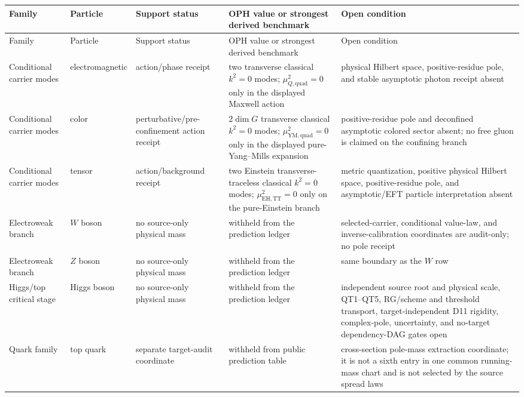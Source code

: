 \documentclass[11pt]{article}
\begin{document}
\tiny
\setlength{\tabcolsep}{2pt}
\begin{longtable}{@{}>{\raggedright\arraybackslash}p{}>{\raggedright\arraybackslash}p{}>{\raggedright\arraybackslash}p{}>{\raggedright\arraybackslash}p{}>{\raggedright\arraybackslash}p{}@{}}
\toprule
Family & Particle & Support status & OPH value or strongest derived benchmark & Open condition \\
\midrule
\endfirsthead
\toprule
Family & Particle & Support status & OPH value or strongest derived benchmark & Open condition \\
\midrule
\endhead
\bottomrule
\endfoot
Conditional carrier modes & electromagnetic & action/phase receipt & two transverse classical \(k^2=0\) modes; \(\mu_{Q,\mathrm{quad}}^2=0\) only in the displayed Maxwell action & physical Hilbert space, positive-residue pole, and stable asymptotic photon receipt absent \\
Conditional carrier modes & color & perturbative/pre-confinement action receipt & \(2\dim G\) transverse classical \(k^2=0\) modes; \(\mu_{\mathrm{YM},\mathrm{quad}}^2=0\) only in the displayed pure-Yang--Mills expansion & positive-residue pole and deconfined asymptotic colored sector absent; no free gluon is claimed on the confining branch \\
Conditional carrier modes & tensor & action/background receipt & two Einstein transverse-traceless classical \(k^2=0\) modes; \(\mu_{\mathrm{EH},\mathrm{TT}}^2=0\) only on the pure-Einstein branch & metric quantization, positive physical Hilbert space, positive-residue pole, and asymptotic/EFT particle interpretation absent \\
Electroweak branch & \(W\) boson & no source-only physical mass & withheld from the prediction ledger & selected-carrier, conditional value-law, and inverse-calibration coordinates are audit-only; no pole receipt \\
Electroweak branch & \(Z\) boson & no source-only physical mass & withheld from the prediction ledger & same boundary as the \(W\) row \\
Higgs/top critical stage & Higgs boson & no source-only physical mass & withheld from the prediction ledger & independent source root and physical scale, QT1--QT5, RG/scheme and threshold transport, target-independent D11 rigidity, complex-pole, uncertainty, and no-target dependency-DAG gates open \\
Quark family & top quark & separate target-audit coordinate & withheld from public prediction table & cross-section pole-mass extraction coordinate; it is not a sixth entry in one common running-mass chart and is not selected by the source spread laws \\

\end{longtable}
\end{document}
